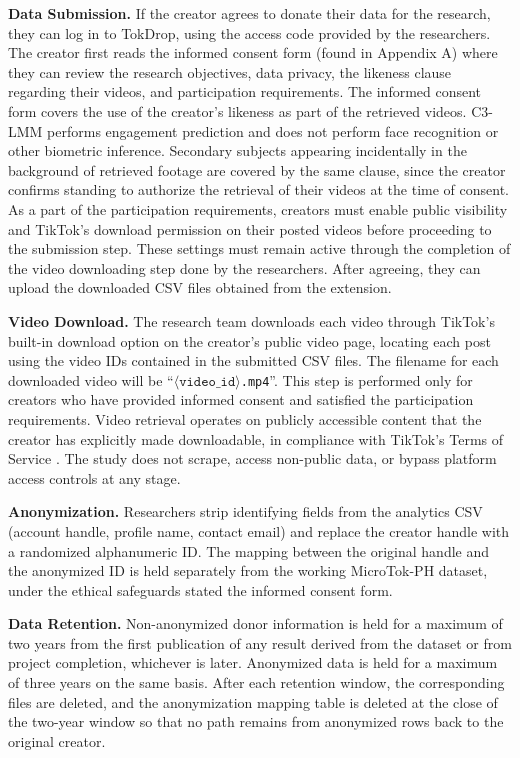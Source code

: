 \textbf{Data Submission.} If the creator agrees to donate their data for the research, they can log in to TokDrop, using the access code provided by the researchers. The creator first reads the informed consent form (found in Appendix A) where they can review the research objectives, data privacy, the likeness clause regarding their videos, and participation requirements. The informed consent form covers the use of the creator's likeness as part of the retrieved videos. C3-LMM performs engagement prediction and does not perform face recognition or other biometric inference. Secondary subjects appearing incidentally in the background of retrieved footage are covered by the same clause, since the creator confirms standing to authorize the retrieval of their videos at the time of consent. As a part of the participation requirements, creators must enable public visibility and TikTok's download permission on their posted videos before proceeding to the submission step. These settings must remain active through the completion of the video downloading step done by the researchers. After agreeing, they can upload the downloaded CSV files obtained from the extension.

\textbf{Video Download.} The research team downloads each video through TikTok's built-in download option on the creator's public video page, locating each post using the video IDs contained in the submitted CSV files. The filename for each downloaded video will be ``$\langle \texttt{video\_id}\rangle$\texttt{.mp4}''. This step is performed only for creators who have provided informed consent and satisfied the participation requirements. Video retrieval operates on publicly accessible content that the creator has explicitly made downloadable, in compliance with TikTok's Terms of Service \cite{tiktok_tos_2026}. The study does not scrape, access non-public data, or bypass platform access controls at any stage.

\textbf{Anonymization.} Researchers strip identifying fields from the analytics CSV (account handle, profile name, contact email) and replace the creator handle with a randomized alphanumeric ID. The mapping between the original handle and the anonymized ID is held separately from the working MicroTok-PH dataset, under the ethical safeguards stated the informed consent form.

\textbf{Data Retention.} Non-anonymized donor information is held for a maximum of two years from the first publication of any result derived from the dataset or from project completion, whichever is later. Anonymized data is held for a maximum of three years on the same basis. After each retention window, the corresponding files are deleted, and the anonymization mapping table is deleted at the close of the two-year window so that no path remains from anonymized rows back to the original creator.


